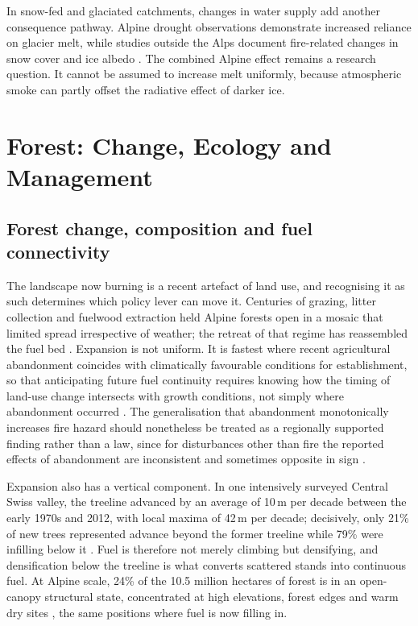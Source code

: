 \documentclass[11pt,a4paper]{article}
\begin{document}
In snow-fed and glaciated catchments, changes in water supply add another consequence pathway. Alpine drought observations demonstrate increased reliance on glacier melt, while studies outside the Alps document fire-related changes in snow cover and ice albedo \citep{leone_20222023_2026, micheletty_application_2014, aubrywake_fire_2022}. The combined Alpine effect remains a research question. It cannot be assumed to increase melt uniformly, because atmospheric smoke can partly offset the radiative effect of darker ice.

\section{Forest: Change, Ecology and Management}
\label{sec:forest}

\subsection{Forest change, composition and fuel connectivity}

The landscape now burning is a recent artefact of land use, and recognising it as such determines which policy lever can move it. Centuries of grazing, litter collection and fuelwood extraction held Alpine forests open in a mosaic that limited spread irrespective of weather; the retreat of that regime has reassembled the fuel bed \citep{bebi_changes_2017}. Expansion is not uniform. It is fastest where recent agricultural abandonment coincides with climatically favourable conditions for establishment, so that anticipating future fuel continuity requires knowing how the timing of land-use change intersects with growth conditions, not simply where abandonment occurred \citep{garbarino_contrasting_2020}. The generalisation that abandonment monotonically increases fire hazard should nonetheless be treated as a regionally supported finding rather than a law, since for disturbances other than fire the reported effects of abandonment are inconsistent and sometimes opposite in sign \citep{mantero_influence_2020}.

Expansion also has a vertical component. In one intensively surveyed Central Swiss valley, the treeline advanced by an average of 10\,m per decade between the early 1970s and 2012, with local maxima of 42\,m per decade; decisively, only 21\% of new trees represented advance beyond the former treeline while 79\% were infilling below it \citep{frei_evidence_2023}. Fuel is therefore not merely climbing but densifying, and densification below the treeline is what converts scattered stands into continuous fuel. At Alpine scale, 24\% of the 10.5 million hectares of forest is in an open-canopy structural state, concentrated at high elevations, forest edges and warm dry sites \citep{stritih_alternative_2023}, the same positions where fuel is now filling in.
\end{document}
